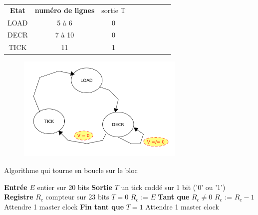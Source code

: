 \documentclass[10pt]{article}
\begin{document}
            
        \begin{table}[h]
            \centering
            \begin{tabular}{ccccccccc}
                   \textbf{Etat} & \textbf{numéro de lignes} & sortie T \\
                     LOAD        &         5 à 6             &    0     \\
                     DECR        &         7 à 10            &    0     \\
                     TICK        &          11               &    1     \\
                \end{tabular}
        \end{table}
        
        \begin{figure}[h!]
            \includegraphics[width=8cm]{h100diag.png}
            \caption{}
        \end{figure}
        
        
        \newpage
        \begin{algorithm}
            \caption{Algorithme qui tourne en boucle sur le bloc}
            \begin{algorithmic}[1]
                \State \textbf{Entrée} $E$ entier sur 20 bits
                \State \textbf{Sortie} $T$ un tick coddé sur 1 bit ('0' ou '1')
                \State \textbf{Registre} $R_c$ compteur sur 23 bits
                    \State $T = 0$
                    \State $R_c$ := $E$
                    \State \textbf{Tant que} $R_c \neq 0$
                        \State \qquad $R_c$ := $R_c - 1$
                        \State \qquad Attendre 1 master clock
                    \State \textbf{Fin tant que}
                    \State $T = 1$
                    \State Attendre 1 master clock
                \EndFunction
            \end{algorithmic}
        \end{algorithm}
        
\end{document}
